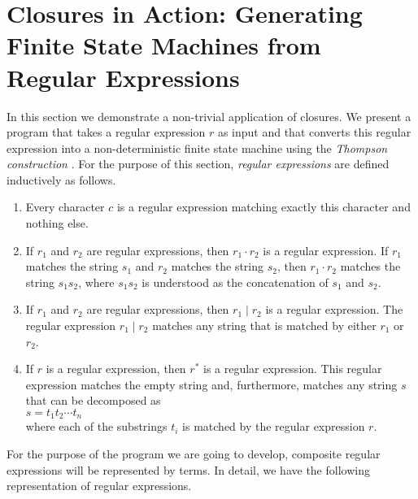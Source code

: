 \section[Closures in Action]{Closures in Action: Generating Finite State Machines from Regular Expressions}
In this section we demonstrate a non-trivial application of closures.  We present a program that
takes a regular expression $r$ as input and that converts this regular expression into a
non-deterministic finite state machine using the \emph{Thompson construction} \cite{hopcroft:06}.
For the purpose of this section, \emph{regular expressions} are defined inductively as
follows.
\begin{enumerate}
\item Every character $c$ is a regular expression matching exactly this character and
      nothing else.
\item If $r_1$ and $r_2$ are regular expressions,  then $r_1 \cdot r_2$ is a regular
      expression.  If $r_1$ matches the string $s_1$ and $r_2$ matches the string $s_2$,
      then $r_1 \cdot r_2$ matches the string $s_1s_2$, where $s_1s_2$ is understood as
      the concatenation of $s_1$ and $s_2$.
\item If $r_1$ and $r_2$ are regular expressions,  then $r_1 \mid r_2$ is a regular
      expression.  The regular expression $r_1 \mid r_2$ matches any string that is matched
      by either $r_1$ or $r_2$.
\item If $r$ is a regular expression, then $r^*$ is a regular expression.
      This regular expression matches the empty string and, furthermore, matches any string
      $s$ that can be decomposed as
      \\[0.2cm]
      \hspace*{1.3cm}
      $s = t_1 t_2 \cdots t_n$
      \\[0.2cm]
      where each of the substrings $t_i$ is matched by the regular expression $r$.
\end{enumerate}
For the purpose of the program we are going to develop, composite regular expressions will be
represented by terms.  In detail, we have the following representation of regular
expressions.
